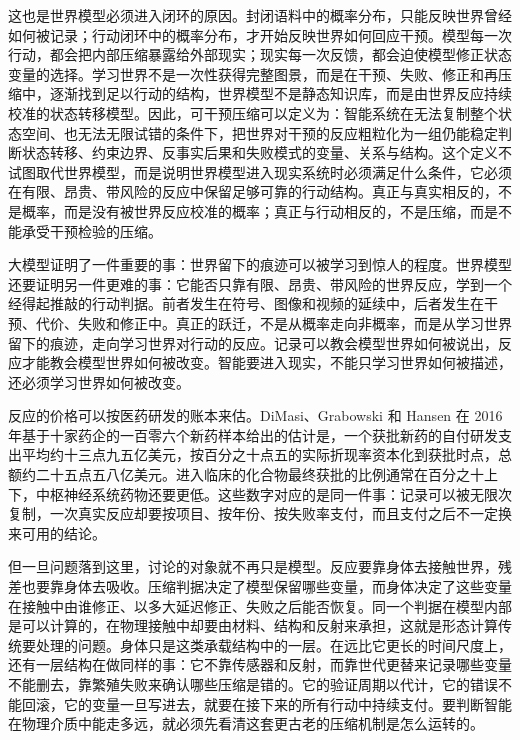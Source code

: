 这也是世界模型必须进入闭环的原因。封闭语料中的概率分布，只能反映世界曾经如何被记录；行动闭环中的概率分布，才开始反映世界如何回应干预。模型每一次行动，都会把内部压缩暴露给外部现实；现实每一次反馈，都会迫使模型修正状态变量的选择。学习世界不是一次性获得完整图景，而是在干预、失败、修正和再压缩中，逐渐找到足以行动的结构，世界模型不是静态知识库，而是由世界反应持续校准的状态转移模型。因此，可干预压缩可以定义为：智能系统在无法复制整个状态空间、也无法无限试错的条件下，把世界对干预的反应粗粒化为一组仍能稳定判断状态转移、约束边界、反事实后果和失败模式的变量、关系与结构。这个定义不试图取代世界模型，而是说明世界模型进入现实系统时必须满足什么条件，它必须在有限、昂贵、带风险的反应中保留足够可靠的行动结构。真正与真实相反的，不是概率，而是没有被世界反应校准的概率；真正与行动相反的，不是压缩，而是不能承受干预检验的压缩。


大模型证明了一件重要的事：世界留下的痕迹可以被学习到惊人的程度。世界模型还要证明另一件更难的事：它能否只靠有限、昂贵、带风险的世界反应，学到一个经得起推敲的行动判据。前者发生在符号、图像和视频的延续中，后者发生在干预、代价、失败和修正中。真正的跃迁，不是从概率走向非概率，而是从学习世界留下的痕迹，走向学习世界对行动的反应。记录可以教会模型世界如何被说出，反应才能教会模型世界如何被改变。智能要进入现实，不能只学习世界如何被描述，还必须学习世界如何被改变。

反应的价格可以按医药研发的账本来估。DiMasi、Grabowski 和 Hansen 在 2016 年基于十家药企的一百零六个新药样本给出的估计是，一个获批新药的自付研发支出平均约十三点九五亿美元，按百分之十点五的实际折现率资本化到获批时点，总额约二十五点五八亿美元\cite{dimasi2016}。进入临床的化合物最终获批的比例通常在百分之十上下，中枢神经系统药物还要更低。这些数字对应的是同一件事：记录可以被无限次复制，一次真实反应却要按项目、按年份、按失败率支付，而且支付之后不一定换来可用的结论。

但一旦问题落到这里，讨论的对象就不再只是模型。反应要靠身体去接触世界，残差也要靠身体去吸收。压缩判据决定了模型保留哪些变量，而身体决定了这些变量在接触中由谁修正、以多大延迟修正、失败之后能否恢复。同一个判据在模型内部是可以计算的，在物理接触中却要由材料、结构和反射来承担，这就是形态计算传统要处理的问题。身体只是这类承载结构中的一层。在远比它更长的时间尺度上，还有一层结构在做同样的事：它不靠传感器和反射，而靠世代更替来记录哪些变量不能删去，靠繁殖失败来确认哪些压缩是错的。它的验证周期以代计，它的错误不能回滚，它的变量一旦写进去，就要在接下来的所有行动中持续支付。要判断智能在物理介质中能走多远，就必须先看清这套更古老的压缩机制是怎么运转的。


